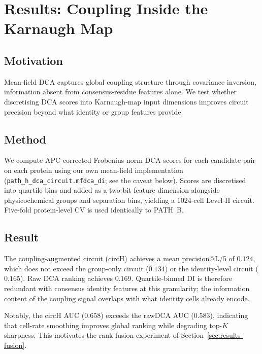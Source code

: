 \section{Results: Coupling Inside the Karnaugh Map}
\label{sec:results-coupling}

\subsection{Motivation}
Mean-field DCA captures global coupling structure through covariance inversion,
information absent from consensus-residue features alone.  We test whether
discretising DCA scores into Karnaugh-map input dimensions improves circuit
precision beyond what identity or group features provide.

\subsection{Method}
We compute APC-corrected Frobenius-norm DCA scores for each candidate pair on
each protein using our own mean-field implementation
(\texttt{path\_h\_dca\_circuit.mfdca\_di}; see the caveat below).  Scores are discretised into quartile bins and added as
a two-bit feature dimension alongside physicochemical groups and separation
bins, yielding a 1024-cell Level-H circuit.  Five-fold protein-level CV is used
identically to PATH~B.

\subsection{Result}
The coupling-augmented circuit (circH) achieves a mean precision@L/5 of
$0.124$, which does not exceed the group-only circuit ($0.134$) or the
identity-level circuit ($0.165$).  Raw DCA ranking achieves $0.169$.
Quartile-binned DI is therefore redundant with consensus identity features at
this granularity; the information content of the coupling signal overlaps with
what identity cells already encode.

Notably, the circH AUC ($0.658$) exceeds the rawDCA AUC ($0.583$), indicating
that cell-rate smoothing improves global ranking while degrading top-$K$
sharpness.  This motivates the rank-fusion experiment of
Section~\ref{sec:results-fusion}.

